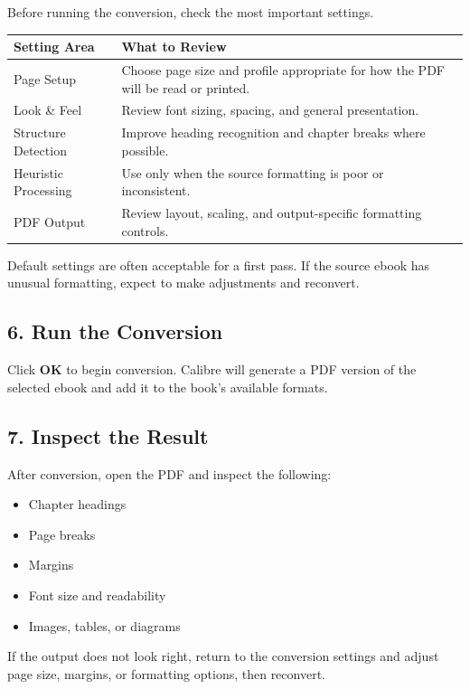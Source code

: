 \documentclass[11pt]{article}
\begin{document}
Before running the conversion, check the most important settings.

\begin{tabularx}{\textwidth}{>{\raggedright\arraybackslash}p{} X}
\toprule
\textbf{Setting Area} & \textbf{What to Review} \\
\midrule
Page Setup & Choose page size and profile appropriate for how the PDF will be read or printed. \\
Look \& Feel & Review font sizing, spacing, and general presentation. \\
Structure Detection & Improve heading recognition and chapter breaks where possible. \\
Heuristic Processing & Use only when the source formatting is poor or inconsistent. \\
PDF Output & Review layout, scaling, and output-specific formatting controls. \\
\bottomrule
\end{tabularx}

\medskip

\noindent Default settings are often acceptable for a first pass. If the source ebook has unusual formatting, expect to make adjustments and reconvert.

\subsection{6. Run the Conversion}

Click \textbf{OK} to begin conversion. Calibre will generate a PDF version of the selected ebook and add it to the book's available formats.

\subsection{7. Inspect the Result}

After conversion, open the PDF and inspect the following:

\begin{itemize}
    \item Chapter headings
    \item Page breaks
    \item Margins
    \item Font size and readability
    \item Images, tables, or diagrams
\end{itemize}

\noindent If the output does not look right, return to the conversion settings and adjust page size, margins, or formatting options, then reconvert.
\end{document}
